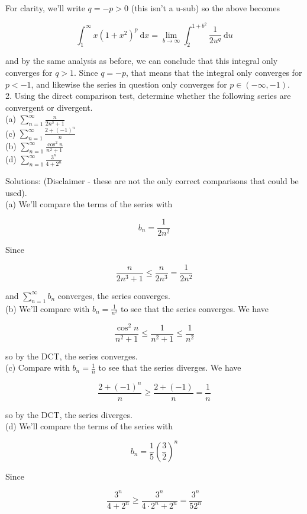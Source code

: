 \documentclass[10pt]{article}
\begin{document}
For clarity, we'll write $q=-p>0$ (this isn't a u-sub) so the above becomes

$$
\int_{1}^{\infty} x\left(1+x^{2}\right)^{p} \mathrm{~d} x=\lim _{b \rightarrow \infty} \int_{2}^{1+b^{2}} \frac{1}{2 u^{q}} \mathrm{~d} u
$$

and by the same analysis as before, we can conclude that this integral only converges for $q>1$. Since $q=-p$, that means that the integral only converges for $p<-1$, and likewise the series in question only converges for $p \in(-\infty,-1)$.\\
2. Using the direct comparison test, determine whether the following series are convergent or divergent.\\
(a) $\sum_{n=1}^{\infty} \frac{n}{2 n^{3}+1}$\\
(c) $\sum_{n=1}^{\infty} \frac{2+(-1)^{n}}{n}$\\
(b) $\sum_{n=1}^{\infty} \frac{\cos ^{2} n}{n^{2}+1}$\\
(d) $\sum_{n=1}^{\infty} \frac{3^{n}}{4+2^{n}}$

Solutions: (Disclaimer - these are not the only correct comparisons that could be used).\\
(a) We'll compare the terms of the series with

$$
b_{n}=\frac{1}{2 n^{2}}
$$

Since

$$
\frac{n}{2 n^{3}+1} \leq \frac{n}{2 n^{3}}=\frac{1}{2 n^{2}}
$$

and $\sum_{n=1}^{\infty} b_{n}$ converges, the series converges.\\
(b) We'll compare with $b_{n}=\frac{1}{n^{2}}$ to see that the series converges. We have

$$
\frac{\cos ^{2} n}{n^{2}+1} \leq \frac{1}{n^{2}+1} \leq \frac{1}{n^{2}}
$$

so by the DCT, the series converges.\\
(c) Compare with $b_{n}=\frac{1}{n}$ to see that the series diverges. We have

$$
\frac{2+(-1)^{n}}{n} \geq \frac{2+(-1)}{n}=\frac{1}{n}
$$

so by the DCT, the series diverges.\\
(d) We'll compare the terms of the series with

$$
b_{n}=\frac{1}{5}\left(\frac{3}{2}\right)^{n}
$$

Since

$$
\frac{3^{n}}{4+2^{n}} \geq \frac{3^{n}}{4 \cdot 2^{n}+2^{n}}=\frac{3^{n}}{52^{n}}
$$
\end{document}
